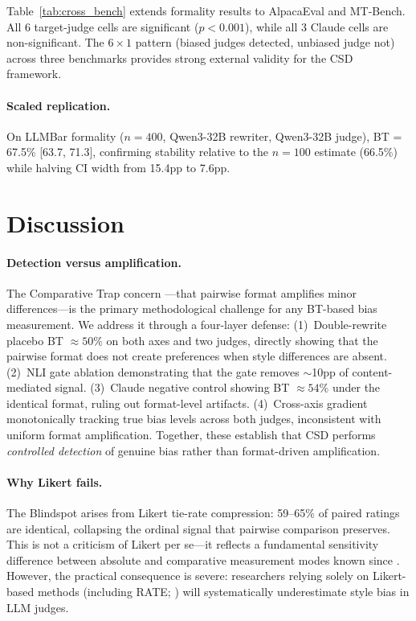 \documentclass[11pt]{article}
\begin{document}
Table~\ref{tab:cross_bench} extends formality results to AlpacaEval and MT-Bench.
All 6 target-judge cells are significant ($p < 0.001$), while all 3 Claude cells are non-significant.
The $6{\times}1$ pattern (biased judges detected, unbiased judge not) across three benchmarks provides strong external validity for the CSD framework.

\paragraph{Scaled replication.}
On LLMBar formality ($n = 400$, Qwen3-32B rewriter, Qwen3-32B judge), BT = 67.5\% [63.7, 71.3], confirming stability relative to the $n = 100$ estimate (66.5\%) while halving CI width from 15.4pp to 7.6pp.

\section{Discussion}
\label{sec:discussion}

\paragraph{Detection versus amplification.}
\label{sec:amplification}
The Comparative Trap concern \citep{jeong2025comparative}---that pairwise format amplifies minor differences---is the primary methodological challenge for any BT-based bias measurement.
We address it through a four-layer defense:
(1)~Double-rewrite placebo BT $\approx 50\%$ on both axes and two judges, directly showing that the pairwise format does not create preferences when style differences are absent.
(2)~NLI gate ablation demonstrating that the gate removes $\sim$10pp of content-mediated signal.
(3)~Claude negative control showing BT $\approx 54\%$ under the identical format, ruling out format-level artifacts.
(4)~Cross-axis gradient monotonically tracking true bias levels across both judges, inconsistent with uniform format amplification.
Together, these establish that CSD performs \emph{controlled detection} of genuine bias rather than format-driven amplification.

\paragraph{Why Likert fails.}
The Blindspot arises from Likert tie-rate compression: 59--65\% of paired ratings are identical, collapsing the ordinal signal that pairwise comparison preserves.
This is not a criticism of Likert per se---it reflects a fundamental sensitivity difference between absolute and comparative measurement modes known since \citet{thurstone1927law}.
However, the practical consequence is severe: researchers relying solely on Likert-based methods (including RATE; \citealp{ye2024beyond}) will systematically underestimate style bias in LLM judges.
\end{document}
